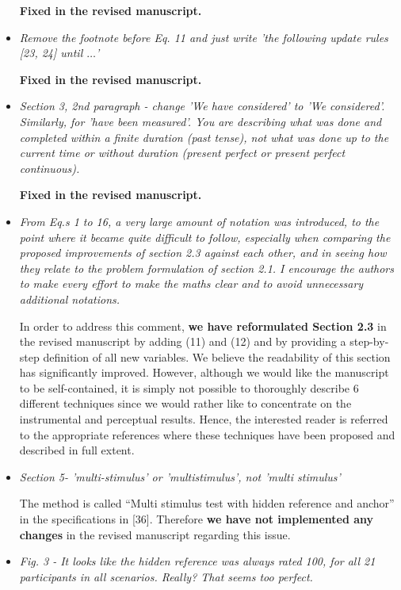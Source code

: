\documentclass[10pt, a4paper]{article}
\begin{document}
\begin{itemize}
{\textbf{Fixed in the revised manuscript.}}

\item {\textit{Remove the footnote before Eq. 11 and just write 'the following update rules [23, 24] until $\ldots$'}}

{\textbf{Fixed in the revised manuscript.}}

\item {\textit{Section 3, 2nd paragraph - change 'We have considered' to 'We considered'. Similarly, for 'have been measured'. You are describing what was done and completed within a finite duration (past tense), not what was done up to the current time or without duration (present perfect or present perfect continuous).}}

{\textbf{Fixed in the revised manuscript.}}

\item {\textit{From Eq.s 1 to 16, a very large amount of notation was introduced, to the point where it became quite difficult to follow, especially when comparing the proposed improvements of section 2.3 against each other, and in seeing how they relate to the problem formulation of section 2.1. I encourage the authors to make every effort to make the maths clear and to avoid unnecessary additional notations.}}

In order to address this comment, {\textbf{we have reformulated Section 2.3}} in the revised manuscript by adding (11) and (12) and by providing a step-by-step definition of all new variables.
We believe the readability of this section has significantly improved.
However, although we would like the manuscript to be self-contained, it is simply not possible to thoroughly describe $6$ different techniques since we would rather like to concentrate on the instrumental and perceptual results. 
Hence, the interested reader is referred to the appropriate references where these techniques have been proposed and described in full extent.

\item {\textit{Section 5- 'multi-stimulus' or 'multistimulus', not 'multi stimulus'}}

The method is called ``Multi stimulus test with hidden reference and anchor'' in the specifications in [36].
Therefore {\textbf{we have not implemented any changes}} in the revised manuscript regarding this issue.

\item {\textit{Fig. 3 - It looks like the hidden reference was always rated 100, for all 21 participants in all scenarios. Really? That seems too perfect.}}


\end{itemize}
\end{document}
